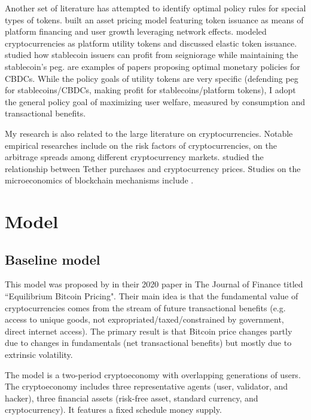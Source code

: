 \documentclass[12pt]{article}
\begin{document}
Another set of literature has attempted to identify optimal policy rules for special types of tokens. \citet{cong2021tokenomics, cong2022token} built an asset pricing model featuring token issuance as means of platform financing and user growth leveraging network effects. \citet{sockin2023decentralization, sockin2023model} modeled cryptocurrencies as platform utility tokens and discussed elastic token issuance. \citet{d2022can} studied how stablecoin issuers can profit from seigniorage while maintaining the stablecoin's peg. \citet{fernandez2021central, zhu2019framework} are examples of papers proposing optimal monetary policies for CBDCs. While the policy goals of utility tokens are very specific (defending peg for stablecoins/CBDCs, making profit for stablecoins/platform tokens), I adopt the general policy goal of maximizing user welfare, measured by consumption and transactional benefits.

My research is also related to the large literature on cryptocurrencies. Notable empirical researches include \cite{liu2021risks} on the risk factors of cryptocurrencies, \cite{makarov2020trading} on the arbitrage spreads among different cryptocurrency markets. \cite{griffin2020bitcoin} studied the relationship between Tether purchases and cryptocurrency prices. Studies on the microeconomics of blockchain mechanisms include \citet{budish2018economic, biais2019blockchain, gans2019more, gans2022mechanism, huberman2021monopoly}.


\section{Model} 
\label{sec:model}

\subsection{Baseline model} 
\label{sec:baseline}
This model was proposed by \citeauthor*{biais2020equilibrium} in their 2020 paper in The Journal of Finance titled ``Equilibrium Bitcoin Pricing". Their main idea is that the fundamental value of cryptocurrencies comes from the stream of future transactional benefits (e.g. access to unique goods, not expropriated/taxed/constrained by government, direct internet access). The primary result is that Bitcoin price changes partly due to changes in fundamentals (net transactional benefits) but mostly due to extrinsic volatility.

The model is a two-period cryptoeconomy with overlapping generations of users. The cryptoeconomy includes three representative agents (user, validator, and hacker), three financial assets (risk-free asset, standard currency, and cryptocurrency). It features a fixed schedule money supply.
\end{document}

